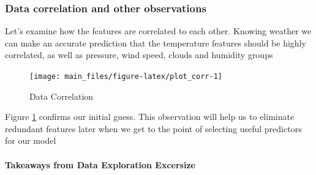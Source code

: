 \hypertarget{data-correlation-and-other-observations}{%
\subsubsection{Data correlation and other
observations}\label{data-correlation-and-other-observations}}

Let's examine how the features are correlated to each other. Knowing
weather we can make an accurate prediction that the temperature features
should be highly correlated, as well as pressure, wind speed, clouds and
humidity groups

\begin{Schunk}
\begin{figure}[H]

{\centering \texttt{[image: main\_files/figure-latex/plot\_corr-1]} 

}

\caption[Data Correlation]{Data Correlation}\label{fig:plot_corr}
\end{figure}
\end{Schunk}

Figure \ref{fig:plot_corr} confirms our initial guess. This observation
will help us to eliminate redundant features later when we get to the
point of selecting useful predictors for our model

\hypertarget{takeaways-from-data-exploration-excersize}{%
\paragraph{Takeaways from Data Exploration
Excersize}\label{takeaways-from-data-exploration-excersize}}

